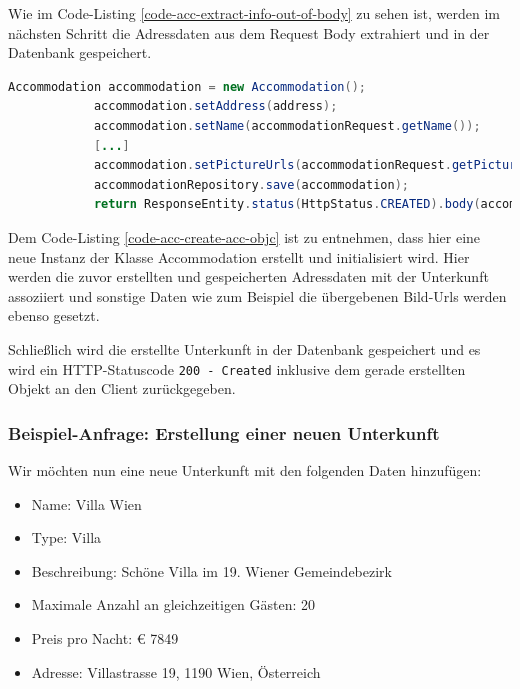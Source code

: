 			Wie im Code-Listing \ref{code-acc-extract-info-out-of-body} zu sehen ist, werden im nächsten Schritt die Adressdaten aus dem Request Body extrahiert und in der Datenbank gespeichert.
			
			\begin{lstlisting}[caption={Erstellung eines neuen Accommodation-Objektes.}, label={code-acc-create-acc-objc}, language=Java]
			Accommodation accommodation = new Accommodation();
			accommodation.setAddress(address);
			accommodation.setName(accommodationRequest.getName());
			[...]
			accommodation.setPictureUrls(accommodationRequest.getPictureUrls());
			accommodationRepository.save(accommodation);
			return ResponseEntity.status(HttpStatus.CREATED).body(accommodation);
		\end{lstlisting}
		
		Dem Code-Listing \ref{code-acc-create-acc-objc} ist zu entnehmen, dass hier eine neue Instanz der Klasse Accommodation erstellt und initialisiert wird. Hier werden die zuvor erstellten und gespeicherten Adressdaten mit der Unterkunft assoziiert und sonstige Daten wie zum Beispiel die übergebenen Bild-Urls werden ebenso gesetzt.
		
		Schließlich wird die erstellte Unterkunft in der Datenbank gespeichert und es wird ein HTTP-Statuscode \texttt{200 - Created} inklusive dem gerade erstellten Objekt an den Client zurückgegeben.
		
		\subsubsection{Beispiel-Anfrage: Erstellung einer neuen Unterkunft}
		
		Wir möchten nun eine neue Unterkunft mit den folgenden Daten hinzufügen:
		
		\begin{itemize}
			\item Name: Villa Wien
			\item Type: Villa
			\item Beschreibung: Schöne Villa im 19. Wiener Gemeindebezirk
			\item Maximale Anzahl an gleichzeitigen Gästen: 20
			\item Preis pro Nacht: € 7849
			\item Adresse: Villastrasse 19, 1190 Wien, Österreich    
		\end{itemize}
		
